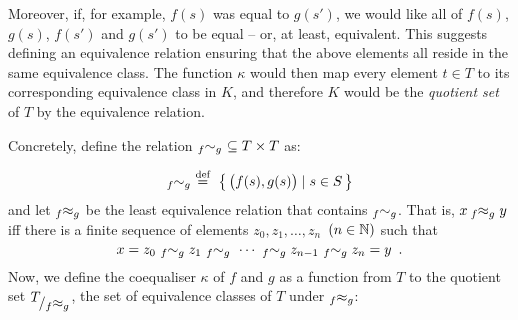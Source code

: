 Moreover, if, for example, $f(s)$ was equal to $g(s')$, we would like all of
$f(s)$, $g(s)$, $f(s')$ and $g(s')$ to be equal -- or, at least, equivalent.
This suggests defining an equivalence relation ensuring that the above elements
all reside in the same equivalence class. The function $\kappa$ would then map
every element $t \in T$ to its corresponding equivalence class in $K$, and
therefore $K$ would be the \emph{quotient set} of $T$ by the equivalence
relation.

Concretely, define the relation $ {}_{f}\hspace{-3px}\sim_{g}\ \subseteq T
\times T$ as:

\begin{equation*}
    {}_{f}\hspace{-3px}\sim_{g}\ 
    \eqdef\ 
    \bigsetof{\,\big(f(s), g(s)\big) \suchthat s \in S\,}
\end{equation*}
and let ${}_{f}\hspace{-3px}\approx_{g}$ be the least equivalence relation
that contains ${}_{f}\hspace{-3px}\sim_{g}$. That is, 
$x\: {}_f\hspace*{-3px}\approx_g y$ iff there is a finite sequence of elements
$z_0, z_1, \ldots, z_n$~$(n\in\mathbb{N})$ such that 
\[
 x = z_0\ 
 {}_f\hspace*{-3px}\sim_g 
 z_1 \
 {}_f\hspace*{-3px}\sim_g 
 \ \cdots \
 {}_f\hspace*{-3px}\sim_g 
 z_{n-1}\
 {}_f\hspace*{-3px}\sim_g 
 z_n = y
 \enspace.  
\]
Now, we define the coequaliser $\kappa$ of $f$ and $g$ as a function from $T$
to the quotient set $T_{\mbox{/${}_f\hspace*{-3px}\approx_g$}}$, the set of
equivalence classes of $T$ under ${}_f\hspace*{-3px}\approx_g$:

\begin{center}
\end{center}

